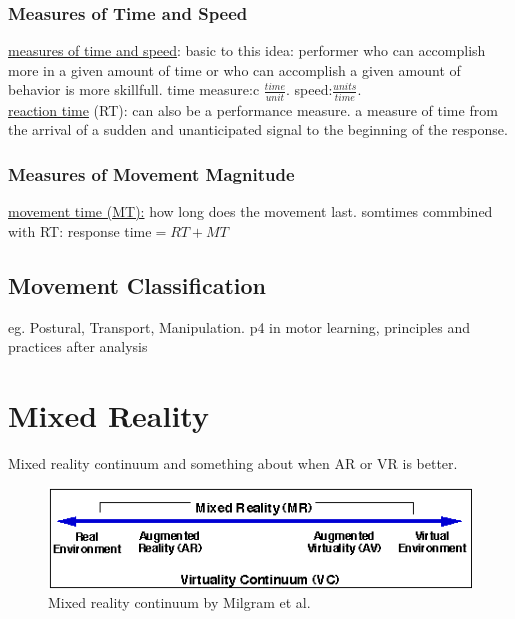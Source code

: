 \subsubsection{Measures of Time and Speed}
\underline{measures of time and speed}: basic to this idea: performer who can accomplish more in a given amount of time or who can accomplish a given amount of behavior is  more skillfull. time measure:c $\frac{time}{unit}$. speed:$\frac{units}{time}$.\\

\underline{reaction time} (RT): can also be a performance measure. a measure of time from the arrival of a sudden and unanticipated signal to the beginning of the response. 
\subsubsection{Measures of Movement Magnitude}
\underline{movement time (MT):} how long does the movement last. somtimes commbined with RT: response time$=RT+MT$

\subsection{Movement Classification}
eg. Postural, Transport, Manipulation. p4 in motor learning, principles and practices
\todo after analysis

\section{Mixed Reality}
Mixed reality continuum \cite{Milgram1994} and something about when AR or VR is better. \todo \markAsevenMR

\begin{figure}
	\centering
	\includegraphics[width=1.0\textwidth]{img/milgram_continuum.png}
	\caption{Mixed reality continuum by Milgram et al. \cite{Milgram1994}}
	\label{fig:ego-exo-cont}
\end{figure}

